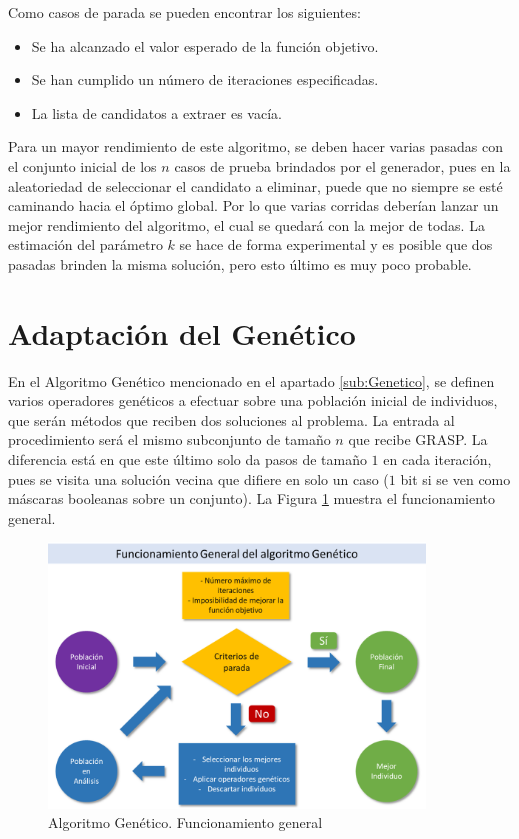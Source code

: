 \documentclass[a4paper,openright,11pt,oneside]{book}
\begin{document}
		Como casos de parada se pueden encontrar los siguientes:
		
		\begin{itemize}
			\item Se ha alcanzado el valor esperado de la función objetivo.
			\item Se han cumplido un número de iteraciones especificadas.
			\item La lista de candidatos a extraer es vacía.
		\end{itemize}
	
		Para un mayor rendimiento de este algoritmo, se deben hacer varias pasadas con el conjunto inicial de los $n$ casos de prueba brindados por el generador, pues en la aleatoriedad de seleccionar el candidato a eliminar, puede que no siempre se esté caminando hacia el óptimo global. Por lo que varias corridas deberían lanzar un mejor rendimiento del algoritmo, el cual se quedará con la mejor de todas. La estimación del parámetro $k$ se hace de forma experimental y es posible que dos pasadas brinden la misma solución, pero esto último es muy poco probable.
		
	\section{Adaptación del Genético}
		En el Algoritmo Genético mencionado en el apartado \ref{sub:Genetico}, se definen varios operadores genéticos a efectuar sobre una población inicial de individuos, que serán métodos que reciben dos soluciones al problema. La entrada al procedimiento será el mismo subconjunto de tamaño $n$ que recibe GRASP. La diferencia está en que este último solo da pasos de tamaño $1$ en cada iteración, pues se visita una solución vecina que difiere en solo un caso ($1$ bit si se ven como máscaras booleanas sobre un conjunto). La Figura \ref{Genetico. General} muestra el funcionamiento general.
		
		\begin{figure}[h]
			\centering
			\includegraphics[width=10cm]{./Graphics/GraficoGenetico1.png}
			\caption{Algoritmo Genético. Funcionamiento general}
			\label{Genetico. General}
		\end{figure}
		
\end{document}
